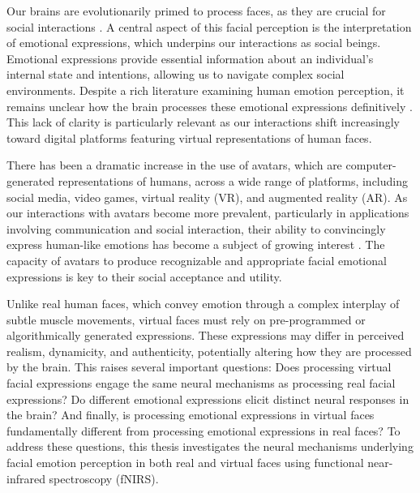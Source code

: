 Our brains are evolutionarily primed to process faces, as they are crucial for social interactions \citep{powell_social_2018}. 
A central aspect of this facial perception is the interpretation of emotional expressions, which underpins our interactions as social beings. 
Emotional expressions provide essential information about an individual's internal state and intentions, allowing us to navigate complex social environments.
Despite a rich literature examining human emotion perception, it remains unclear how the brain processes these emotional expressions definitively \citep{barrett_are_2006}. 
This lack of clarity is particularly relevant as our interactions shift increasingly toward digital platforms featuring virtual representations of human faces.

There has been a dramatic increase in the use of avatars, which are computer-generated representations of humans, across a wide range of platforms, including social media, video games, virtual reality (VR), and augmented reality (AR). 
As our interactions with avatars become more prevalent, particularly in applications involving communication and social interaction, their ability to convincingly express human-like emotions has become a subject of growing interest \citep{kegel_dynamic_2020}. 
The capacity of avatars to produce recognizable and appropriate facial emotional expressions is key to their social acceptance and utility.

Unlike real human faces, which convey emotion through a complex interplay of subtle muscle movements, virtual faces must rely on pre-programmed or algorithmically generated expressions. 
These expressions may differ in perceived realism, dynamicity, and authenticity, potentially altering how they are processed by the brain. 
This raises several important questions: Does processing virtual facial expressions engage the same neural mechanisms as processing real facial expressions? 
Do different emotional expressions elicit distinct neural responses in the brain? 
And finally, is processing emotional expressions in virtual faces fundamentally different from processing emotional expressions in real faces?
To address these questions, this thesis investigates the neural mechanisms underlying facial emotion perception in both real and virtual faces using functional near-infrared spectroscopy (fNIRS).

